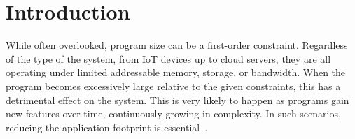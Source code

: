 \section{Introduction}
\label{sec:introduction}

While often overlooked, program size can be a first-order constraint. Regardless of the type of the system, from IoT devices up to cloud servers, they are all operating under limited addressable memory, storage, or bandwidth. When the program becomes excessively large relative to the given constraints, this has a detrimental effect on the system. 
This is very likely to happen as programs gain new features over time, continuously growing in complexity.
In such scenarios, reducing the application footprint is essential~\cite{schultz03,varma04,sehgal12,keoh14,auler17,chabbi21}.




